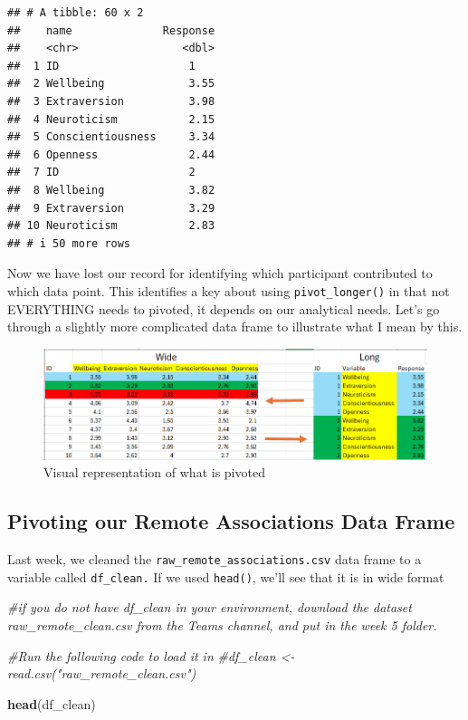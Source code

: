 \documentclass[
]{book}
\newenvironment{Shaded}{\begin{snugshade}}{\end{snugshade}}
\newcommand{\CommentTok}[1]{\textcolor[rgb]{0.56,0.35,0.01}{\textit{#1}}}
\newcommand{\FunctionTok}[1]{\textcolor[rgb]{0.13,0.29,0.53}{\textbf{#1}}}
\newcommand{\NormalTok}[1]{#1}
\begin{document}
\begin{verbatim}
## # A tibble: 60 x 2
##    name              Response
##    <chr>                <dbl>
##  1 ID                    1   
##  2 Wellbeing             3.55
##  3 Extraversion          3.98
##  4 Neuroticism           2.15
##  5 Conscientiousness     3.34
##  6 Openness              2.44
##  7 ID                    2   
##  8 Wellbeing             3.82
##  9 Extraversion          3.29
## 10 Neuroticism           2.83
## # i 50 more rows
\end{verbatim}

Now we have lost our record for identifying which participant contributed to which data point. This identifies a key about using \texttt{pivot\_longer()} in that not EVERYTHING needs to pivoted, it depends on our analytical needs. Let's go through a slightly more complicated data frame to illustrate what I mean by this.

\begin{figure}
\centering
\includegraphics{img/06-pivot-visualisation.png}
\caption{\label{fig:unnamed-chunk-230}Visual representation of what is pivoted}
\end{figure}

\hypertarget{pivoting-our-remote-associations-data-frame}{%
\subsection{Pivoting our Remote Associations Data Frame}\label{pivoting-our-remote-associations-data-frame}}

Last week, we cleaned the \texttt{raw\_remote\_associations.csv} data frame to a variable called \texttt{df\_clean.} If we used \texttt{head()}, we'll see that it is in wide format

\begin{Shaded}
\begin{Highlighting}[]
\CommentTok{\#if you do not have df\_clean in your environment, download the dataset \textasciigrave{}raw\_remote\_clean.csv\textasciigrave{} from the Teams channel, and put in the week 5 folder. }

\CommentTok{\#Run the following code to load it in }
\CommentTok{\#df\_clean \textless{}{-} read.csv("raw\_remote\_clean.csv") }

\FunctionTok{head}\NormalTok{(df\_clean)}
\end{Highlighting}
\end{Shaded}
\end{document}
